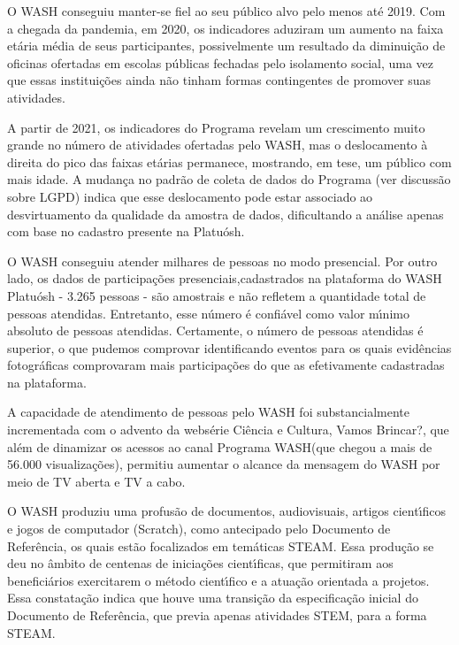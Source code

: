 \documentclass[
12pt,		%
openright,	%
twoside,  %
a4paper,			%
chapter=TITLE,		%
english,			%
french,				%
spanish,			%
brazil				%
]{USPSC-classe/USPSC}
\begin{document}
\begin{alineas}
\item O WASH conseguiu manter-se fiel ao seu p\'ublico alvo pelo menos at\'e 2019. Com a chegada da pandemia, em 2020, os indicadores  aduziram um aumento na faixa et\'aria m\'edia de seus participantes, possivelmente um resultado da diminui\c{c}\~ao de oficinas ofertadas em escolas p\'ublicas fechadas pelo isolamento social, uma vez que essas institui\c{c}\~oes ainda n\~ao tinham formas contingentes de promover suas atividades.
\item A partir de 2021, os indicadores do Programa revelam um crescimento muito grande no n\'umero de atividades ofertadas pelo WASH, mas o deslocamento \`a direita do pico das faixas et\'arias permanece, mostrando, em tese, um p\'ublico com mais idade. A mudan\c{c}a no padr\~ao de coleta de dados do Programa (ver discuss\~ao sobre LGPD) indica que esse deslocamento pode estar associado ao desvirtuamento da qualidade da amostra de dados, dificultando a an\'alise apenas com base no cadastro presente na Platu\'osh.
\item O WASH conseguiu atender milhares de pessoas no modo presencial. Por outro lado, os dados de participa\c{c}\~oes presenciais,cadastrados na plataforma do WASH Platu\'osh - 3.265 pessoas - s\~ao amostrais e n\~ao refletem a quantidade total de pessoas atendidas. Entretanto, esse n\'umero \'e confi\'avel como valor m\'{\i}nimo absoluto de pessoas atendidas. Certamente, o n\'umero de pessoas atendidas \'e  superior, o que pudemos comprovar identificando eventos para os quais evid\^encias fotogr\'aficas comprovaram mais participa\c{c}\~oes do que as efetivamente cadastradas na plataforma.
\item A capacidade de atendimento de pessoas pelo WASH foi substancialmente incrementada com o advento da webs\'erie \textquotedbl Ci\^encia e Cultura, Vamos Brincar?\textquotedbl , que al\'em de dinamizar os acessos ao canal \textquotedbl Programa WASH\textquotedbl  (que chegou a mais de 56.000 visualiza\c{c}\~oes), permitiu  aumentar o alcance da mensagem do WASH por meio de TV aberta e TV a cabo.
\item O WASH produziu uma profus\~ao de documentos, audiovisuais, artigos cient\'{\i}ficos e jogos de computador (Scratch), como antecipado pelo Documento de Refer\^encia, os quais est\~ao focalizados em tem\'aticas STEAM. Essa produ\c{c}\~ao se deu no \^ambito de centenas de inicia\c{c}\~oes cient\'{\i}ficas, que permitiram aos benefici\'arios exercitarem o m\'etodo cient\'{\i}fico e a atua\c{c}\~ao orientada a projetos. Essa constata\c{c}\~ao indica que houve uma transi\c{c}\~ao da especifica\c{c}\~ao inicial do Documento de Refer\^encia, que previa apenas atividades STEM, para a forma STEAM.

\end{alineas}
\end{document}
